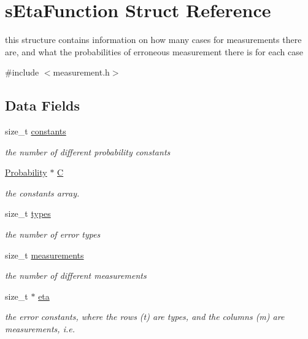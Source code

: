 \hypertarget{structsEtaFunction}{\section{s\-Eta\-Function \-Struct \-Reference}
\label{structsEtaFunction}
}


this structure contains information on how many cases for measurements there are, and what the probabilities of erroneous measurement there is for each case  




{\ttfamily \#include $<$measurement.\-h$>$}

\subsection*{\-Data \-Fields}
\begin{DoxyCompactItemize}
\item 
size\-\_\-t \hyperlink{structsEtaFunction_a1fdf63f3a73e7fd663491e72421619f9}{constants}
\begin{DoxyCompactList}\small\item\em the number of different probability constants \end{DoxyCompactList}\item 
\hyperlink{measurement_8h_ae6d7a8c80f18bc080ab1cfa38d119724}{\-Probability} $\ast$ \hyperlink{structsEtaFunction_a05c2f93c1148d5268d359d78540c10be}{\-C}
\begin{DoxyCompactList}\small\item\em the constants array. \end{DoxyCompactList}\item 
size\-\_\-t \hyperlink{structsEtaFunction_afd94a9856047e0987c5e8667a4838b71}{types}
\begin{DoxyCompactList}\small\item\em the number of error types \end{DoxyCompactList}\item 
size\-\_\-t \hyperlink{structsEtaFunction_aa323ef11935cd1e8d6ef56405ab96cf8}{measurements}
\begin{DoxyCompactList}\small\item\em the number of different measurements \end{DoxyCompactList}\item 
size\-\_\-t $\ast$ \hyperlink{structsEtaFunction_a7585a59b1861523157055f8c8b0263e3}{eta}
\begin{DoxyCompactList}\small\item\em the error constants, where the rows (t) are types, and the columns (m) are measurements, i.\-e. \end{DoxyCompactList}\end{DoxyCompactItemize}


